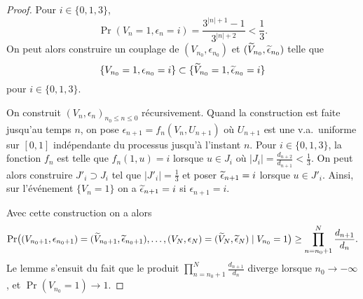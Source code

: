 \documentclass[12pt,a4paper]{article}
\begin{document}
\begin{proof}
Pour $i \in \{0,1,3\}$, 
$$
\Pr(V_n=1, \epsilon_n=i) = \frac{3^{|n|+1}-1}{3^{|n|+2}} < \frac{1}{3}.
$$
On peut alors construire un couplage de 
$(V_{n_0}, \epsilon_{n_0})$ et $(\widetilde{V}_{n_0},\widetilde{\epsilon}_{n_0})$ telle que 
$$
\{V_{n_0}=1, \epsilon_{n_0}=i\} \subset \{\widetilde{V}_{n_0}=1,\widetilde{\epsilon}_{n_0} = i\} 
$$
pour $i \in \{0,1,3\}$. 

On construit ${(V_n, \epsilon_n)}_{n_0 \leq n \leq 0}$ récursivement. 
Quand la construction est faite jusqu'au temps $n$, 
on pose $\epsilon_{n+1} = f_n(V_n, U_{n+1})$ où 
$U_{n+1}$ est une v.a.\ uniforme sur $[0,1]$ indépendante du processus jusqu'à 
l'instant $n$. Pour $i \in \{0,1,3\}$, la fonction $f_n$ est telle que 
$f_n(1, u) = i$ lorsque $u \in J_i$ où  $|J_i| = \frac{d_{n+2}}{d_{n+1}} < \frac{1}{3}$. 
On peut alors construire $J'_i \supset J_i$ tel que $|J'_i|=\frac{1}{3}$ et 
poser $\widetilde{\epsilon}_{n+1}=i$ lorsque $u \in J'_i$. 
Ainsi, sur l'événement $\{V_n=1\}$ on a $\widetilde{\epsilon}_{n+1}=i$ si $\epsilon_{n+1}=i$. 

Avec cette construction on a alors 
$$
\Pr\bigl((V_{n_0+1}, \epsilon_{n_0+1})=(\widetilde{V}_{n_0+1}, \widetilde{\epsilon}_{n_0+1}), 
\ldots, (V_N, \epsilon_{N})=(\widetilde{V}_{N},\widetilde{\epsilon}_{N}) 
\mid V_{n_0}=1 \bigr) \geq \prod_{n=n_0+1}^N \frac{d_{n+1}}{d_{n}}.  
$$
Le lemme s'ensuit du fait que le  produit $\prod_{n=n_0+1}^N \frac{d_{n+1}}{d_{n}}$ diverge lorsque $n_0 \to -\infty$, 
et $\Pr(V_{n_0}=1) \to 1$. 
\end{proof}



%
%
%
\end{document}

